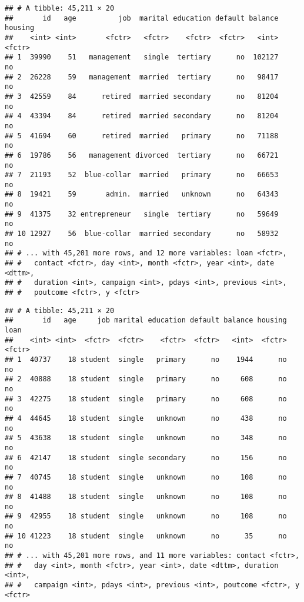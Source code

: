 \documentclass[]{book}
\newenvironment{Shaded}{\begin{snugshade}}{\end{snugshade}}
\newcommand{\KeywordTok}[1]{\textcolor[rgb]{0.13,0.29,0.53}{\textbf{{#1}}}}
\newcommand{\StringTok}[1]{\textcolor[rgb]{0.31,0.60,0.02}{{#1}}}
\newcommand{\CommentTok}[1]{\textcolor[rgb]{0.56,0.35,0.01}{\textit{{#1}}}}
\newcommand{\NormalTok}[1]{{#1}}
\begin{document}
\begin{verbatim}
## # A tibble: 45,211 × 20
##       id   age          job  marital education default balance housing
##    <int> <int>       <fctr>   <fctr>    <fctr>  <fctr>   <int>  <fctr>
## 1  39990    51   management   single  tertiary      no  102127      no
## 2  26228    59   management  married  tertiary      no   98417      no
## 3  42559    84      retired  married secondary      no   81204      no
## 4  43394    84      retired  married secondary      no   81204      no
## 5  41694    60      retired  married   primary      no   71188      no
## 6  19786    56   management divorced  tertiary      no   66721      no
## 7  21193    52  blue-collar  married   primary      no   66653      no
## 8  19421    59       admin.  married   unknown      no   64343      no
## 9  41375    32 entrepreneur   single  tertiary      no   59649      no
## 10 12927    56  blue-collar  married secondary      no   58932      no
## # ... with 45,201 more rows, and 12 more variables: loan <fctr>,
## #   contact <fctr>, day <int>, month <fctr>, year <int>, date <dttm>,
## #   duration <int>, campaign <int>, pdays <int>, previous <int>,
## #   poutcome <fctr>, y <fctr>
\end{verbatim}

\begin{Shaded}
\end{Shaded}

\begin{verbatim}
## # A tibble: 45,211 × 20
##       id   age     job marital education default balance housing   loan
##    <int> <int>  <fctr>  <fctr>    <fctr>  <fctr>   <int>  <fctr> <fctr>
## 1  40737    18 student  single   primary      no    1944      no     no
## 2  40888    18 student  single   primary      no     608      no     no
## 3  42275    18 student  single   primary      no     608      no     no
## 4  44645    18 student  single   unknown      no     438      no     no
## 5  43638    18 student  single   unknown      no     348      no     no
## 6  42147    18 student  single secondary      no     156      no     no
## 7  40745    18 student  single   unknown      no     108      no     no
## 8  41488    18 student  single   unknown      no     108      no     no
## 9  42955    18 student  single   unknown      no     108      no     no
## 10 41223    18 student  single   unknown      no      35      no     no
## # ... with 45,201 more rows, and 11 more variables: contact <fctr>,
## #   day <int>, month <fctr>, year <int>, date <dttm>, duration <int>,
## #   campaign <int>, pdays <int>, previous <int>, poutcome <fctr>, y <fctr>
\end{verbatim}
\end{document}
